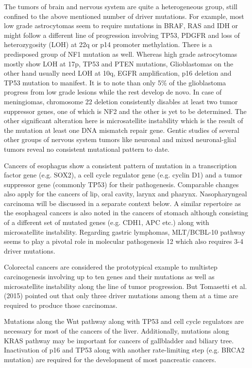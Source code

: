 \documentclass[lineno,sn-basic, Numbered]{sn-jnl}%
\theoremstyle{thmstyleone}%
\theoremstyle{thmstyletwo}%
\theoremstyle{thmstylethree}%
\begin{document}
The tumors of brain and nervous system are quite a heterogeneous group, still confined to the above mentioned number of driver mutations. For example, most low grade astrocytomas seem to require mutations in BRAF, RAS and IDH or might follow a different line of progression involving TP53, PDGFR and loss of heterozygosity (LOH) at 22q or p14 promoter methylation. There is a predisposed group of NF1 mutation as well. Whereas high grade astrocytomas mostly show LOH at 17p, TP53 and PTEN mutations,  Glioblastomas on the other hand usually need LOH at 10q, EGFR amplification, p16 deletion and TP53 mutation to manifest. It is to note than only 5\% of the glioblastoma progress from low grade lesions while the rest develop de novo. In case of meningiomas, chromosome 22 deletion consistently disables at least two tumor suppressor genes, one of which is NF2 and the other is yet to be determined. The other significant alteration here is microsatellite instability which is the result of the mutation at least one DNA mismatch repair gene. Gentic studies of several other groups of nervous system tumors like neuronal and mixed neuronal-glial tumors reveal no consistent mutational pattern to date. 

\par
Cancers of esophagus show a consistent pattern of mutation in a transcription factor gene (e.g. SOX2), a cell cycle regulator gene (e.g. cyclin D1) and a tumor suppressor gene (commonly TP53) for their pathogenesis. Comparable changes also apply for the cancers of lip, oral cavity, larynx and pharynx. Nasopharyngeal carcinoma will be discussed in a separate context below. A similar repertoire as the esophageal cancers is also noted in the cancers of stomach although consisting of a different set of mutated genes (e.g. CDH1, APC etc.) along with microsatellite instability. Regarding gastric lymphomas, MLT/BCBL-10 pathway seems to play a pivotal role in molecular pathogenesis 12 which also requires 3-4 driver mutations.

\par
Colorectal cancers are considered the prototypical example to multistep carcinogenesis \cite{knudson1971mutation} involving up to ten genes and their mutations as well as microsatellite instability along the line of tumor progression. But Tomasetti et al. (2015) \cite{tomasetti2015variation} pointed out that only three driver mutations among them at a time are required to produce those carcinomas.

\par
Mutations along the Wnt pathway along with TP53 and cell cycle regulators are necessary for most of the cancers of the liver. Additionally, mutations along KRAS pathway may be important for cancers of gallbladder and biliary tree. Inactivation of p16 and TP53 along with another rate-limiting step (e.g. BRCA2 mutation) are required for the development of most pancreatic cancers.
\end{document}
